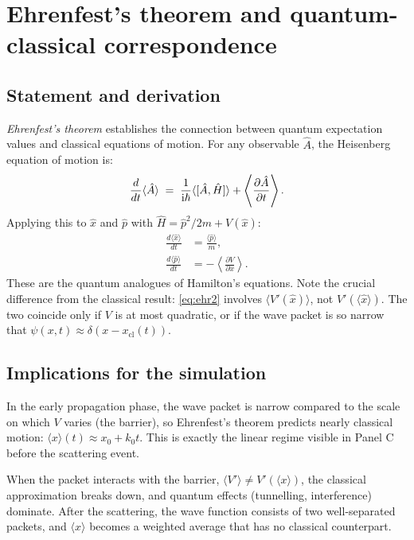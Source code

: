 \documentclass[12pt, a4paper]{article}
\newcommand{\ii}{\mathrm{i}}          %
\begin{document}
\section{Ehrenfest's theorem and quantum-classical correspondence}
\label{app:ehrenfest}

\subsection{Statement and derivation}

\emph{Ehrenfest's theorem} establishes the connection between quantum
expectation values and classical equations of motion.  For any
observable $\hat{A}$, the Heisenberg equation of motion is:
\begin{equation}
  \frac{d}{dt}\langle\hat{A}\rangle \;=\;
  \frac{1}{\ii\hbar}\langle[\hat{A},\hat{H}]\rangle
  + \left\langle\pdv{\hat{A}}{t}\right\rangle.
\end{equation}
Applying this to $\hat{x}$ and $\hat{p}$ with $\hat{H} = \hat{p}^2/2m + V(\hat{x})$:
\begin{align}
  \frac{d\langle\hat{x}\rangle}{dt}
  &= \frac{\langle\hat{p}\rangle}{m}, \label{eq:ehr1} \\
  \frac{d\langle\hat{p}\rangle}{dt}
  &= -\left\langle\frac{\partial V}{\partial x}\right\rangle. \label{eq:ehr2}
\end{align}
These are the quantum analogues of Hamilton's equations.  Note
the crucial difference from the classical result: \eqref{eq:ehr2}
involves $\langle V'(\hat{x})\rangle$, not $V'(\langle\hat{x}\rangle)$.
The two coincide only if $V$ is at most quadratic, or if the wave
packet is so narrow that $\psi(x,t) \approx \delta(x - x_\text{cl}(t))$.

\subsection{Implications for the simulation}

In the early propagation phase, the wave packet is narrow compared to
the scale on which $V$ varies (the barrier), so Ehrenfest's theorem
predicts nearly classical motion: $\langle x\rangle(t) \approx
x_0 + k_0 t$.  This is exactly the linear regime visible in Panel C
before the scattering event.

When the packet interacts with the barrier, $\langle V'\rangle \neq
V'(\langle x\rangle)$, the classical approximation breaks down, and
quantum effects (tunnelling, interference) dominate.  After
the scattering, the wave function consists of two well-separated
packets, and $\langle x\rangle$ becomes a weighted average that has
no classical counterpart.
\end{document}
